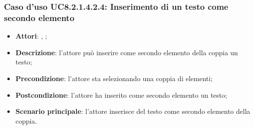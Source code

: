 		\subsubsection{Caso d'uso UC8.2.1.4.2.4: Inserimento di un testo come secondo elemento}
		\label{UC8.2.1.4.2.4}
		\begin{itemize}
			\item \textbf{Attori}: \uau, \uaupro;
			\item \textbf{Descrizione}: l'attore può inserire come secondo elemento della coppia un testo;
			\item \textbf{Precondizione}: l'attore sta selezionando una coppia di elementi;
			\item \textbf{Postcondizione}: l'attore ha inserito come secondo elemento un testo;
			\item \textbf{Scenario principale}: l'attore inserisce del testo come secondo elemento della coppia.
		\end{itemize}
	
